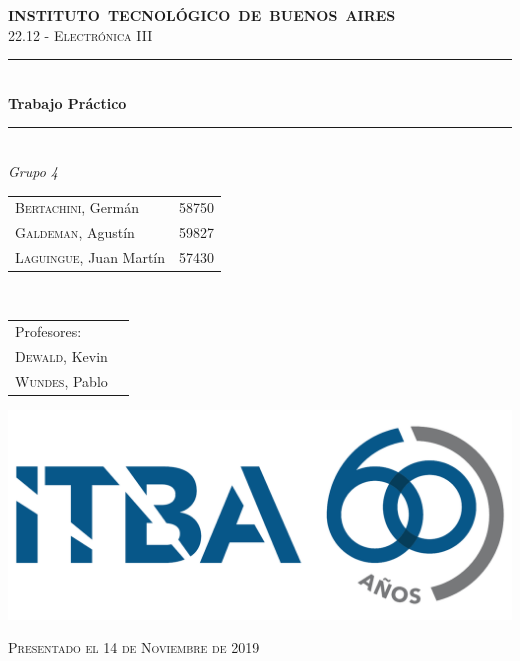 \begin{titlepage}
    \newcommand{\HRule}{\rule{\linewidth}{0.5mm}}
    \begin{center}
	    \mbox{\textsc{\large \bfseries {INSTITUTO TECNOL\'OGICO DE BUENOS AIRES}}} \\[1cm]
	    \textsc{\Large 22.12 - Electr\'onica III} \\[0.5cm]    
	    \HRule \\[0.6cm]
	    { 	\Huge \bfseries Trabajo Pr\'actico 	} \\[0.4cm] 
	    \HRule \\[1.5cm]
	    \large
	    \emph{\Large Grupo 4}\\
	    \vspace{10px}
	   
	    \begin{tabular}{lr}
	    \textsc{Bertachini}, Germ\'an  & 58750 \\ 	
	    \textsc{Galdeman}, Agust\'in  & 59827 \\
	    \textsc{Laguingue}, Juan Mart\'in  & 57430 \\
	    \end{tabular} \\
	    \vspace{20px}
	    \begin{tabular}{lr}
	    \textsc{}Profesores:\\
	    \textsc{Dewald}, Kevin\\
	    \textsc{Wundes}, Pablo\\
	    \end{tabular}
	    \vspace{60px}
	
		\includegraphics[scale=0.20]{Extras/ITBA.png}    
		\vspace{30px}
	    
	    \textsc{\large Presentado el 14 de Noviembre de 2019}\\
    \end{center}
\end{titlepage}
